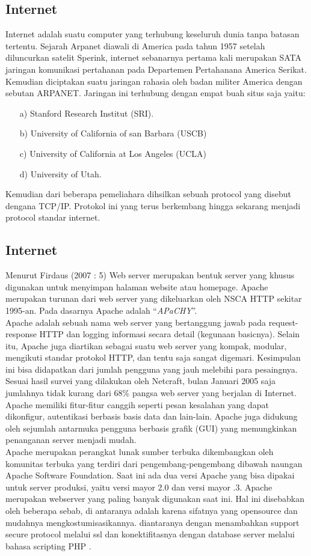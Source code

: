\documentclass{jtetiproposalskripsi}
\begin{document}
\subsection{Internet}
Internet adalah suatu computer yang terhubung keseluruh dunia tanpa batasan tertentu. Sejarah Arpanet diawali di America pada tahun 1957 setelah diluncurkan satelit Sperink, internet sebanarnya pertama kali merupakan SATA jaringan komunikasi pertahanan pada Departemen Pertahanana America Serikat. Kemudian diciptakan suatu jaringan rahasia oleh badan militer America dengan sebutan ARPANET. Jaringan ini terhubung dengan empat buah situs saja yaitu:
\begin{itemize}
\item[a)]Stanford  Research Institut (SRI).
\item[b)]University of California of san Barbara (USCB) 
\item[c)]University of California at Los Angeles (UCLA) 
\item[d)]University of Utah.
\end{itemize}

Kemudian dari beberapa pemeliahara dihsilkan sebuah protocol yang disebut dengana TCP/IP. Protokol ini yang terus berkembang hingga sekarang menjadi protocol standar internet.

\subsection{Internet}
Menurut  Firdaus  (2007  :  5)  Web  server  merupakan  bentuk  server  yang khusus digunakan untuk menyimpan halaman website atau homepage. Apache merupakan turunan dari web server yang dikeluarkan oleh NSCA HTTP sekitar 1995-an. Pada dasarnya Apache adalah “\textit{APaCHY}”.
\\
Apache adalah sebuah nama web server yang bertanggung jawab pada request- response HTTP dan logging informasi secara detail (kegunaan basicnya). Selain itu, Apache juga diartikan sebagai suatu web server yang kompak, modular, mengikuti standar protokol HTTP, dan tentu saja sangat digemari. Kesimpulan ini bisa didapatkan dari jumlah pengguna yang jauh melebihi para pesaingnya. Sesuai hasil survei  yang  dilakukan  oleh  Netcraft,  bulan  Januari  2005  saja  jumlahnya  tidak kurang dari 68\% pangsa web server yang berjalan di Internet. Apache memiliki fitur-fitur canggih seperti pesan kesalahan yang dapat dikonfigur, autentikasi berbasis basis data dan lain-lain. Apache juga didukung oleh sejumlah antarmuka pengguna berbasis grafik (GUI) yang memungkinkan penanganan server menjadi mudah.
\\
Apache merupakan perangkat lunak sumber terbuka dikembangkan oleh komunitas terbuka yang terdiri dari pengembang-pengembang dibawah naungan Apache Software Foundation.
Saat ini ada dua versi Apache yang bisa dipakai untuk server produksi, yaitu versi mayor 2.0 dan versi mayor .3. Apache merupakan webserver yang paling banyak digunakan saat ini. Hal ini disebabkan oleh beberapa sebab, di antaranya adalah karena sifatnya yang opensource dan mudahnya mengkostumisasikannya. diantaranya dengan menambahkan support secure protocol melalui ssl dan konektifitasnya dengan database server melalui bahasa scripting PHP .
\end{document}
